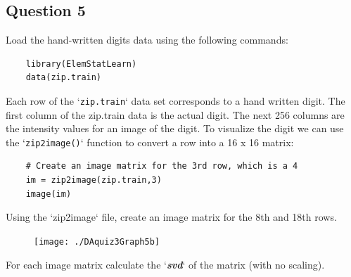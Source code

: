 \documentclass[]{article}
\begin{document}
\subsection*{Question 5}
Load the hand-written digits data using the following commands:

\begin{framed}
	\begin{verbatim}
	library(ElemStatLearn)
	data(zip.train)
	\end{verbatim}
\end{framed}

Each row of the `\texttt{zip.train}` data set corresponds to a hand written digit. The
first column of the zip.train data is the actual digit. The next 256 columns
are the intensity values for an image of the digit. To visualize the digit we
can use the `\texttt{zip2image()}` function to convert a row into a 16 x 16 matrix:

\begin{framed}
	\begin{verbatim}
	# Create an image matrix for the 3rd row, which is a 4
	im = zip2image(zip.train,3)
	image(im)
	\end{verbatim}
\end{framed}


Using the `zip2image` file, create an image matrix for the 8th and 18th rows.
\begin{figure}
	\centering
	\texttt{[image: ./DAquiz3Graph5b]}
	\caption{}
	\label{fig:DAquiz3Graph5}
\end{figure}
For each image matrix calculate the `\textit{\textbf{svd}}` of the matrix (with no scaling). 
\end{document}
